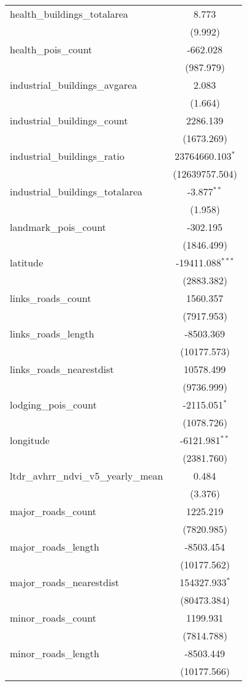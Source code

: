 \begin{table}[!htbp]
\begin{tabular}{@{\extracolsep{5pt}}lc}
 health_buildings_totalarea & 8.773$^{}$ \\
  & (9.992) \\
 health_pois_count & -662.028$^{}$ \\
  & (987.979) \\
 industrial_buildings_avgarea & 2.083$^{}$ \\
  & (1.664) \\
 industrial_buildings_count & 2286.139$^{}$ \\
  & (1673.269) \\
 industrial_buildings_ratio & 23764660.103$^{*}$ \\
  & (12639757.504) \\
 industrial_buildings_totalarea & -3.877$^{**}$ \\
  & (1.958) \\
 landmark_pois_count & -302.195$^{}$ \\
  & (1846.499) \\
 latitude & -19411.088$^{***}$ \\
  & (2883.382) \\
 links_roads_count & 1560.357$^{}$ \\
  & (7917.953) \\
 links_roads_length & -8503.369$^{}$ \\
  & (10177.573) \\
 links_roads_nearestdist & 10578.499$^{}$ \\
  & (9736.999) \\
 lodging_pois_count & -2115.051$^{*}$ \\
  & (1078.726) \\
 longitude & -6121.981$^{**}$ \\
  & (2381.760) \\
 ltdr_avhrr_ndvi_v5_yearly_mean & 0.484$^{}$ \\
  & (3.376) \\
 major_roads_count & 1225.219$^{}$ \\
  & (7820.985) \\
 major_roads_length & -8503.454$^{}$ \\
  & (10177.562) \\
 major_roads_nearestdist & 154327.933$^{*}$ \\
  & (80473.384) \\
 minor_roads_count & 1199.931$^{}$ \\
  & (7814.788) \\
 minor_roads_length & -8503.449$^{}$ \\
  & (10177.566) \\

\end{tabular}
\end{table}
